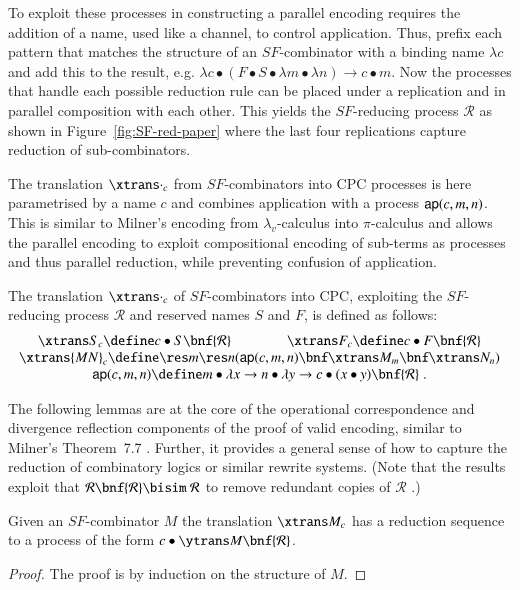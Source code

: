 \documentclass{llncs}
\begin{document}
To exploit these processes in constructing a parallel encoding requires the addition of a name,
used like a channel, to control application. Thus, prefix each pattern that matches the structure
of an $SF$-combinator with a binding name $\lambda c$ and add this to the result, e.g.
$\lambda c\bullet (F\bullet S\bullet \lambda m\bullet \lambda n) \to c\bullet m$.
Now the processes that handle each possible reduction rule can be placed under a replication
and in parallel composition with each other. This yields the $SF$-reducing process ${\mathcal R}$
as shown in Figure~\ref{fig:SF-red-paper} where the last four replications capture reduction of
sub-combinators.

The translation $\xtrans\cdot _c$ from $SF$-combinators into CPC processes is here parametrised by a name $c$ and combines application with a process ${\sf ap}(c,m,n)$.
This is similar to Milner's encoding from $\lambda_v$-calculus into $\pi$-calculus
and
 allows the parallel encoding to exploit compositional encoding of sub-terms as processes and thus parallel reduction, while preventing confusion of application.


The translation $\xtrans\cdot _c$ of $SF$-combinators into CPC, exploiting the $SF$-reducing process ${\mathcal R}$ and reserved names $S$ and $F$, is defined as follows:
\begin{equation*}
\begin{array}{c}
\xtrans S _c \define c\bullet S \bnf {\mathcal R}\qquad\qquad
\xtrans F _c \define c\bullet F \bnf {\mathcal R}\\
\xtrans {MN} _c \define \res m\res n ({\sf ap}(c,m,n)\bnf \xtrans M _m \bnf \xtrans N _n )\\
{\sf ap}(c,m,n) \define m\bullet \lambda x\to n\bullet \lambda y\to c \bullet (x\bullet y)\bnf  {\mathcal R}\; .
\end{array}
\end{equation*}


The following lemmas are at the core of the operational correspondence and divergence
reflection components of the proof of valid encoding, similar to Milner's Theorem~7.7 \cite{90426}.
Further, it provides a general sense of how to capture the reduction of combinatory logics or
similar rewrite systems.
(Note that the results exploit that ${\mathcal R}\bnf {\mathcal R}\bisim\ {\mathcal R}$ to
remove redundant copies of ${\mathcal R}$ \cite[Theorem~8.7.2]{GivenWilsonPHD}.)

\begin{lemma}
\label{lem:SF2CPC-construct}
Given an $SF$-combinator $M$ the translation $\xtrans M _c$ has a reduction sequence to a process of the form $c\bullet\ytrans M\bnf {\mathcal R}$.
\end{lemma}
\begin{proof}
The proof is by induction on the structure of $M$.
\end{proof}
\end{document}
